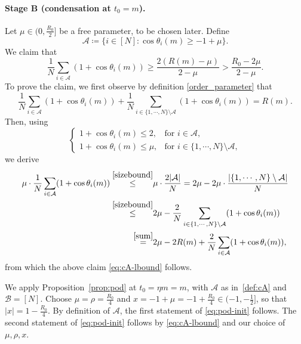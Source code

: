 \documentclass[11pt,reqno]{amsart}
\theoremstyle{definition}
\theoremstyle{remark}
\begin{document}
\paragraph{Stage B (condensation at $t_0=m$).}
Let $\mu\in(0,\frac{R_0}{2}]$ be a free parameter,
to be chosen later.
 Define
\begin{equation}\label{def:cA}
\mathcal A\coloneqq\{i\in[N]\colon\cos\theta_i(m)\ge-1+\mu\}.
\end{equation}
 We claim that 
\begin{equation}\label{eq:cA-lbound}
	\frac 1N\sum_{i\in \mathcal{A}}(1+\cos\theta_i(m))\ge\frac{2(R(m)-\mu)}{2-\mu }>\frac{R_0-2\mu}{2-\mu}.
\end{equation}
To prove the claim, we first observe by definition \eqref{order_parameter} that
 \begin{equation}\label{sum}
 	\frac 1N\sum_{i\in \mathcal{A}}(1+\cos\theta_i(m))+\frac 1N\sum_{i\in \{1,\cdots,N\}\setminus\mathcal{A}}(1+\cos\theta_i(m))=R(m).
 \end{equation}
 Then, using
 \begin{equation}\label{sizebound}
 	\begin{cases}
 		1+\cos\theta_i(m)\le 2, & \mbox{for } i\in \mathcal{A},\\
 		1+\cos\theta_i(m)\le \mu ,&\mbox{for } i\in \{1,\cdots,N\}\setminus\mathcal{A},
 	\end{cases}
 \end{equation}
 we derive
 \begin{align*}
 	\mu \cdot \frac 1N\sum_{i\in \mathcal{A}}(1+\cos\theta_i(m))\stackrel{\eqref{sizebound}}{\le}& \mu \cdot \frac{2|\mathcal{A}|}{N}=2\mu -2\mu \cdot \frac{|\{1,\cdots,N\}\setminus\mathcal{A}|}{N}\\
 	\stackrel{\eqref{sizebound}}{\le} &2\mu -\frac 2N\sum_{i\in \{1,\cdots,N\}\setminus \mathcal{A}}(1+\cos\theta_i(m))\\
 	\stackrel{\eqref{sum}}{=}&2\mu -2R(m)+\frac 2N\sum_{i\in  \mathcal{A}}(1+\cos\theta_i(m)),
 \end{align*}
 from which the above claim \eqref{eq:cA-lbound} follows.


We apply Proposition~\ref{prop:pod} at $t_0=\eta m=m$, with
$\mathcal A$ as in~\eqref{def:cA} and $\mathcal{B}=[N]$. Choose $\mu=\rho=\frac{R_0}{4}$ and $x=-1+\mu=-1+\frac{R_0}{4}\in (-1,-\frac 12]$, so that $|x|=1-\frac{R_0}{4}$. By definition of $\mathcal{A}$, the first statement of \eqref{eq:pod-init} follows. The second statement of \eqref{eq:pod-init} follows by \eqref{eq:cA-lbound} and our choice of $\mu,\rho,x$.
\end{document}

